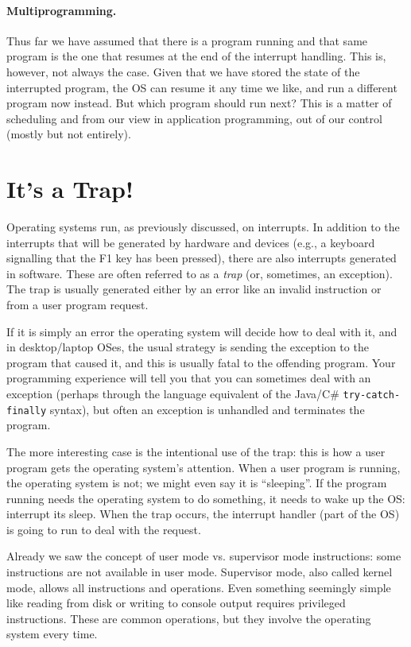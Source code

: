 \paragraph{Multiprogramming.} Thus far we have assumed that there is a program running and that same program is the one that resumes at the end of the interrupt handling. This is, however, not always the case. Given that we have stored the state of the interrupted program, the OS can resume it any time we like, and run a different program now instead. But which program should run next? This is a matter of scheduling and from our view in application programming, out of our control (mostly but not entirely).


\section*{It's a Trap!}
Operating systems run, as previously discussed, on interrupts. In addition to the interrupts that will be generated by hardware and devices (e.g., a keyboard signalling that the F1 key has been pressed), there are also interrupts generated in software. These are often referred to as a \textit{trap} (or, sometimes, an exception). The trap is usually generated either by an error like an invalid instruction or from a user program request. 

If it is simply an error the operating system will decide how to deal with it, and in desktop/laptop OSes, the usual strategy is sending the exception to the program that caused it, and this is usually fatal to the offending program. Your programming experience will tell you that you can sometimes deal with an exception (perhaps through the language equivalent of the Java/C\# \texttt{try-catch-finally} syntax), but often an exception is unhandled and terminates the program.

The more interesting case is the intentional use of the trap: this is how a user program gets the operating system's attention. When a user program is running, the operating system is not; we might even say it is ``sleeping''. If the program running needs the operating system to do something, it needs to wake up the OS: interrupt its sleep. When the trap occurs, the interrupt handler (part of the OS) is going to run to deal with the request. 

Already we saw the concept of user mode vs. supervisor mode instructions: some instructions are not available in user mode. Supervisor mode, also called kernel mode, allows all instructions and operations. Even something seemingly simple like reading from disk or writing to console output requires privileged instructions. These are common operations, but they involve the operating system every time.

